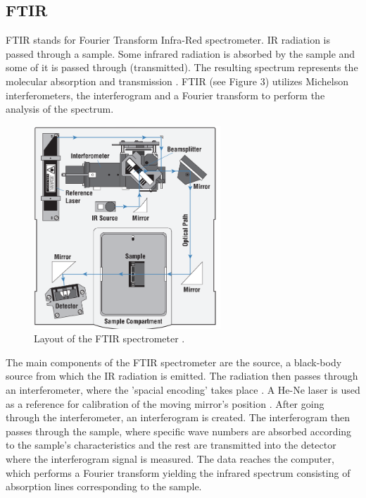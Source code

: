 \documentclass[reprint,amsmath,amssymb,aps, prl]{revtex4-2}
\begin{document}
\subsection{FTIR}
FTIR stands for Fourier Transform Infra-Red spectrometer.
IR radiation is passed through a sample.
Some
infrared radiation is absorbed by the sample and some of it is
passed through (transmitted). The resulting spectrum represents the molecular
absorption and transmission \cite{FTIRmanual}. FTIR (see Figure 3) utilizes Michelson interferometers, the interferogram and a Fourier transform to perform the analysis of the spectrum. 
\begin{figure}[h]
    \includegraphics[width=7cm]{Images/FTIR LAYOUT.png}
    \caption{Layout of the FTIR spectrometer \cite{FTIRmanual}.}
    \label{fig:FTIR}
    \centering
\end{figure}

The main components of the FTIR spectrometer are
the source, a black-body source from which the IR radiation is emitted. The radiation then passes through an interferometer, where the 'spacial encoding' takes place \cite{FTIRmanual}. A He-Ne laser is used as a reference for calibration of the moving mirror's position \cite{stuart}. After going through the interferometer, an interferogram is created. The interferogram then passes through the sample, where specific wave numbers are absorbed according to the sample's characteristics and the rest are transmitted into the detector where the interferogram signal is measured. The data reaches the computer, which performs a Fourier transform yielding the infrared spectrum consisting of absorption lines corresponding to the sample. 
\end{document}
